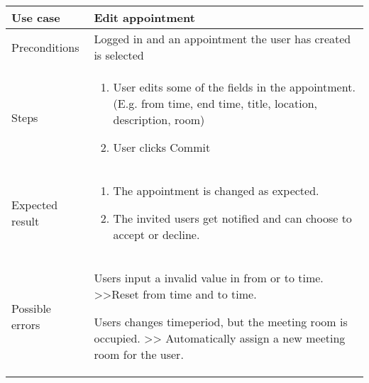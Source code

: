 \documentclass[a4paper, 10pt]{article}
\begin{document}
\begin{tabularx}{\textwidth}{ |X|X| }
\hline
\rowcolor{Gray}
Use case &  Edit appointment \\ \hline
Preconditions & Logged in and an appointment the user has created is selected \\ \hline
Steps & 
\begin{enumerate}
	\item User edits some of the fields in the appointment. (E.g. from time, end time, title, location, description, room)
	\item User clicks Commit
\end{enumerate}\\ \hline
Expected result & 
\begin{enumerate}
	\item The appointment is changed as expected. 
	\item The invited users get notified and can choose to accept or decline.
\end{enumerate} \\ \hline
Possible errors & 
\begin{scenario}
	\item Users input a invalid value in from or to time. >>Reset from time and to time.
	\item Users changes timeperiod, but the meeting room is occupied. >> Automatically assign a new meeting room for the user.
\end{scenario} \\ \hline
\end{tabularx}
\end{document}

